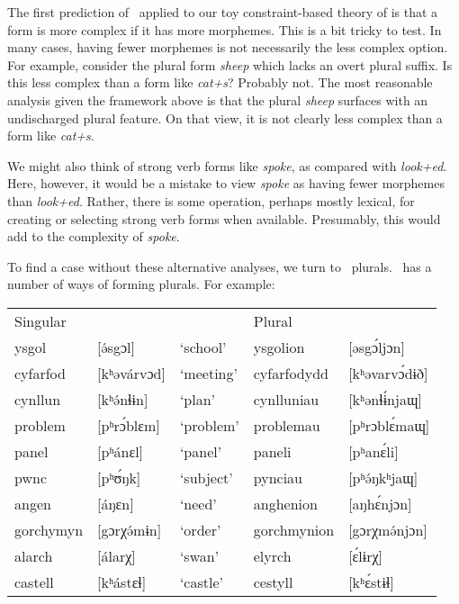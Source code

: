 \documentclass[output=paper,
modfonts
]{LSP/langsci}
\begin{document}
The first prediction of \io\ applied to our toy constraint-based theory of  is that a form is more complex if it has more morphemes. This is a bit tricky to test. In many cases, having fewer morphemes is not necessarily the less complex option. For example, consider the plural form \emph{sheep} which lacks an overt plural suffix. Is this less complex than a form like \emph{cat+s}? Probably not. The most reasonable analysis given the framework above is that the plural \emph{sheep} surfaces with an undischarged plural feature. On that view, it is not clearly less complex than a form like \emph{cat+s}.

We might also think of strong verb forms like \emph{spoke}, as compared with \emph{look+ed}. Here, however, it would be a mistake to view \emph{spoke} as having fewer morphemes than \emph{look+ed}. Rather, there is some operation, perhaps mostly lexical, for creating or selecting strong verb forms when available. Presumably, this would add to the complexity of \emph{spoke}.

To find a case without these alternative analyses, we turn to \w\ plurals. \w\ has a number of ways of forming plurals. For example:

\ea
\small
\begin{tabular}[t]{lllll}
Singular  &             &           & Plural \\
ysgol     & [ə́sgɔl]     & `school'  & ysgolion    & [əsgɔ́ljɔn] \\
cyfarfod  & [kʰəvárvɔd] & `meeting' & cyfarfodydd & [kʰəvarvɔ́dɨð] \\
cynllun   & [kʰə́nɬɨn]   & `plan'    & cynlluniau  & [kʰənɬɨ́njaɰ] \\
problem   & [pʰrɔ́blɛm]  & `problem' & problemau   & [pʰrɔblɛ́maɰ] \\
panel     & [pʰánɛl]    & `panel'   & paneli      & [pʰanɛ́li] \\
pwnc      & [pʰʊ́ŋk]     & `subject' & pynciau     & [pʰə́ŋkʰjaɰ] \\
angen     & [áŋɛn]      & `need'    & anghenion   & [aŋhɛ́njɔn] \\
gorchymyn & [gɔrχə́mɨn]  & `order'   & gorchmynion & [gɔrχmə́njɔn] \\
alarch    & [álarχ]     & `swan'    & elyrch      & [ɛ́lɨrχ] \\
castell   & [kʰástɛɬ]   & `castle'  & cestyll     & [kʰɛ́stɨɬ] \\
\end{tabular}
\z
\end{document}
